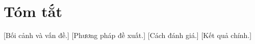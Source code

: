 \chapter*{Tóm tắt}
\onehalfspacing
\vspace{1.0cm}

[Bối cảnh và vấn đề.] [Phương pháp đề xuất.] [Cách đánh giá.] [Kết quả chính.]

\bigskip
